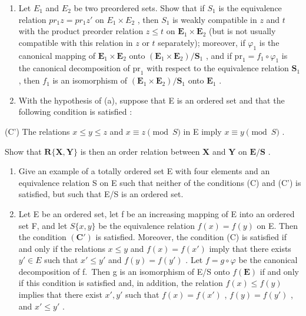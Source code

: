 \begin{enumerate}
\def\labelenumi{(\alph{enumi})}
\setcounter{enumi}{2}
\item
  Let \(E_{1}\) and \(E_{2}\) be two preordered sets. Show that if \(S_{1}\) is the equivalence relation \(pr_{1}z = pr_{1}z'\) on \(E_{1} \times E_{2}\) , then \(S_{1}\) is weakly compatible in \(z\) and \(t\) with the product preorder relation \(z \leqslant t\) on \(\mathbf{E}_1 \times \mathbf{E}_2\) (but is not usually compatible with this relation in \(z\) or \(t\) separately); moreover, if \(\varphi_1\) is the canonical mapping of \(\mathbf{E}_1 \times \mathbf{E}_2\) onto \((\mathbf{E}_1 \times \mathbf{E}_2)/\mathbf{S}_1\) , and if \(\mathrm{pr}_1 = f_1 \circ \varphi_1\) is the canonical decomposition of \(\mathrm{pr}_1\) with respect to the equivalence relation \(\mathbf{S}_1\) , then \(f_1\) is an isomorphism of \((\mathbf{E}_1 \times \mathbf{E}_2)/\mathbf{S}_1\) onto \(\mathbf{E}_1\) .
\item
  With the hypothesis of (a), suppose that E is an ordered set and that the following condition is satisfied :
\end{enumerate}

(C') The relations \(x \leqslant y \leqslant z\) and \(x \equiv z \pmod{S}\) in E imply \(x \equiv y \pmod{S}\) .

Show that \(\mathbf{R}\{\mathbf{X},\mathbf{Y}\}\) is then an order relation between \(\mathbf{X}\) and \(\mathbf{Y}\) on \(\mathbf{E} / \mathbf{S}\) .

\begin{enumerate}
\def\labelenumi{(\alph{enumi})}
\setcounter{enumi}{4}
\item
  Give an example of a totally ordered set E with four elements and an equivalence relation S on E such that neither of the conditions (C) and (C') is satisfied, but such that E/S is an ordered set.
\item
  Let E be an ordered set, let f be an increasing mapping of E into an ordered set F, and let \(S\{x,y\}\) be the equivalence relation \(f(x)=f(y)\) on E. Then the condition \((\mathbf{C}')\) is satisfied. Moreover, the condition (C) is satisfied if and only if the relations \(x\leqslant y\) and \(f(x)=f(x')\) imply that there exists \(y'\in E\) such that \(x'\leqslant y'\) and \(f(y)=f(y')\) . Let \(f=g\circ\varphi\) be the canonical decomposition of f.~Then g is an isomorphism of E/S onto \(f(\mathbf{E})\) if and only if this condition is satisfied and, in addition, the relation \(f(x)\leqslant f(y)\) implies that there exist \(x',y'\) such that \(f(x)=f(x')\) , \(f(y)=f(y')\) , and \(x'\leqslant y'\) .
\end{enumerate}

